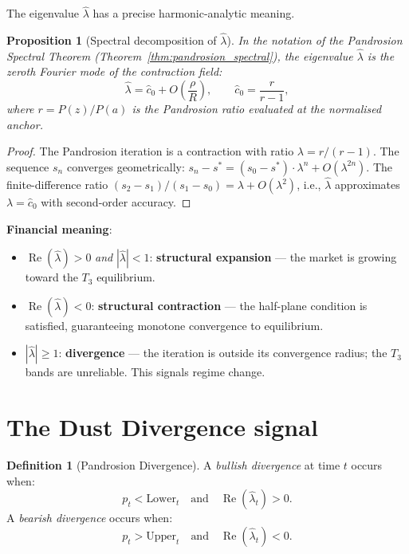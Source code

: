 \documentclass[10pt,a4paper,oneside]{book}
\newtheorem{proposition}[theorem]{Proposition}
\theoremstyle{definition}
\newtheorem{definition}[theorem]{Definition}
\theoremstyle{remark}
\begin{document}
The eigenvalue $\hat{\lambda}$ has a precise harmonic-analytic meaning.

\begin{proposition}[Spectral decomposition of $\hat{\lambda}$]
In the notation of the Pandrosion Spectral Theorem (Theorem~\ref{thm:pandrosion_spectral}), the eigenvalue $\hat{\lambda}$ is the zeroth Fourier mode of the contraction field:
\[
  \hat{\lambda} = \hat{c}_0 + O\!\left(\frac{\rho}{R}\right),
  \qquad \hat{c}_0 = \frac{r}{r-1},
\]
where $r = P(z)/P(a)$ is the Pandrosion ratio evaluated at the normalised anchor.
\end{proposition}

\begin{proof}
The Pandrosion iteration is a contraction with ratio $\lambda = r/(r-1)$.  The sequence $s_n$ converges geometrically: $s_n - s^* = (s_0 - s^*) \cdot \lambda^n + O(\lambda^{2n})$.  The finite-difference ratio $(s_2 - s_1)/(s_1 - s_0) = \lambda + O(\lambda^2)$, i.e., $\hat{\lambda}$ approximates $\lambda = \hat{c}_0$ with second-order accuracy.
\end{proof}

\textbf{Financial meaning}:
\begin{itemize}[nosep]
\item $\operatorname{Re}(\hat{\lambda}) > 0$ \emph{and} $|\hat{\lambda}| < 1$: \textbf{structural expansion} --- the market is growing toward the $T_3$ equilibrium.
\item $\operatorname{Re}(\hat{\lambda}) < 0$: \textbf{structural contraction} --- the half-plane condition is satisfied, guaranteeing monotone convergence to equilibrium.
\item $|\hat{\lambda}| \geq 1$: \textbf{divergence} --- the iteration is outside its convergence radius; the $T_3$ bands are unreliable.  This signals regime change.
\end{itemize}

\section{The Dust Divergence signal}

\begin{definition}[Pandrosion Divergence]
A \emph{bullish divergence} at time $t$ occurs when:
\begin{equation}
  p_t < \text{Lower}_t \quad \text{and} \quad \operatorname{Re}(\hat{\lambda}_t) > 0.
\end{equation}
A \emph{bearish divergence} occurs when:
\begin{equation}
  p_t > \text{Upper}_t \quad \text{and} \quad \operatorname{Re}(\hat{\lambda}_t) < 0.
\end{equation}
\end{definition}
\end{document}

